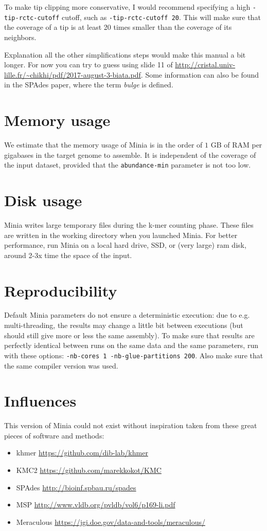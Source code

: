 \documentclass[a4paper]{article}
\begin{document}
To make tip clipping more conservative, I would recommend specifying a high \verb+-tip-rctc-cutoff+ cutoff, such as \verb+-tip-rctc-cutoff 20+. This will make sure that the coverage of a tip is at least 20 times smaller than the coverage of its neighbors.

Explanation all the other simplifications steps would make this manual a bit longer. For now you can try to guess using slide 11 of \url{http://cristal.univ-lille.fr/~chikhi/pdf/2017-august-3-biata.pdf}. Some information can also be found in the SPAdes paper, where the term \emph{bulge} is defined.

\section{Memory usage}

We estimate that the memory usage of Minia is in the order of $1$ GB of RAM per gigabases in the target genome to assemble. It is independent of the coverage of the input dataset, provided that the \verb!abundance-min! parameter is not too low.

\section{Disk usage}

Minia writes large temporary files during the k-mer counting phase. These files are written in the working directory when you launched Minia. For better performance, run Minia on a local hard drive, SSD, or (very large) ram disk, around 2-3x time the space of the input.

\section{Reproducibility}

Default Minia parameters do not ensure a deterministic execution: due to e.g. multi-threading, the results may change a little bit between executions (but should still give more or less the same assembly).
To make sure that results are perfectly identical between runs on the same data and the same parameters, run with these options:
\verb!-nb-cores 1 -nb-glue-partitions 200!. Also make sure that the same compiler version was used.

\section{Influences}

This version of Minia could not exist without inspiration taken from these great pieces of software and methods:
\begin{itemize}
    \item khmer \url{https://github.com/dib-lab/khmer}
    \item KMC2 \url{https://github.com/marekkokot/KMC}
    \item SPAdes \url{http://bioinf.spbau.ru/spades}
    \item MSP \url{http://www.vldb.org/pvldb/vol6/p169-li.pdf}
    \item Meraculous \url{https://jgi.doe.gov/data-and-tools/meraculous/}
\end{itemize}
\end{document}
